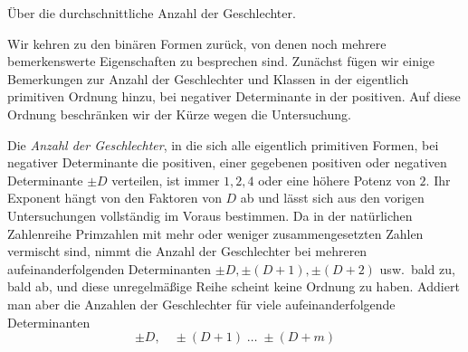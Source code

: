 \begin{center}Über die durchschnittliche Anzahl der Geschlechter.\end{center}


Wir kehren zu den binären Formen zurück, von denen noch mehrere bemerkenswerte Eigenschaften zu besprechen sind. Zunächst fügen wir einige Bemerkungen zur Anzahl der Geschlechter und Klassen in der eigentlich primitiven Ordnung hinzu, bei negativer Determinante in der positiven. Auf diese Ordnung beschränken wir der Kürze wegen die Untersuchung.

Die \textit{Anzahl der Geschlechter}, in die sich alle eigentlich primitiven Formen, bei negativer Determinante die positiven, einer gegebenen positiven oder negativen Determinante \(\pm D\) verteilen, ist immer \(1,2,4\) oder eine höhere Potenz von \(2\). Ihr Exponent hängt von den Faktoren von \(D\) ab und lässt sich aus den vorigen Untersuchungen vollständig im Voraus bestimmen. Da in der natürlichen Zahlenreihe Primzahlen mit mehr oder weniger zusammengesetzten Zahlen vermischt sind, nimmt die Anzahl der Geschlechter bei mehreren
aufeinanderfolgenden Determinanten \(\pm D,\pm(D+1),\pm(D+2)\) usw.\ bald zu, bald ab, und diese unregelmäßige Reihe scheint keine Ordnung zu haben. Addiert man aber die Anzahlen der Geschlechter für viele aufeinanderfolgende Determinanten
\[\pm D,\quad\pm(D+1)\;\ldots\;\pm(D+m)\]

